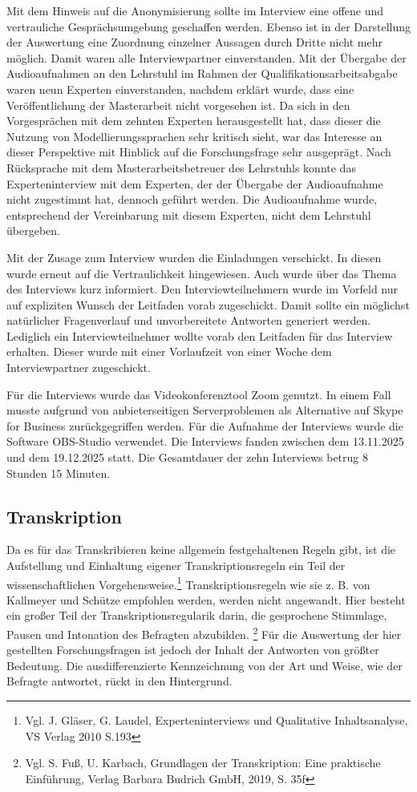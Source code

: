 Mit dem Hinweis auf die Anonymisierung sollte im Interview eine offene und vertrauliche Gesprächsumgebung geschaffen werden. Ebenso ist in der Darstellung der Auswertung eine Zuordnung einzelner Aussagen durch Dritte nicht mehr möglich. Damit waren alle Interviewpartner einverstanden. 
Mit der Übergabe der Audioaufnahmen an den Lehrstuhl im Rahmen der Qualifikationsarbeitsabgabe waren neun Experten einverstanden, nachdem erklärt wurde, dass eine Veröffentlichung der Masterarbeit nicht vorgesehen ist. 
Da sich in den Vorgesprächen mit dem zehnten Experten herausgestellt hat, dass dieser die Nutzung von Modellierungssprachen sehr kritisch sieht, war das Interesse an dieser Perspektive mit Hinblick auf die Forschungsfrage sehr ausgeprägt. Nach Rücksprache mit dem Masterarbeitsbetreuer des Lehrstuhls konnte das Experteninterview mit dem Experten, der der Übergabe der Audioaufnahme nicht zugestimmt hat, dennoch geführt werden. Die Audioaufnahme wurde, entsprechend der Vereinbarung mit diesem Experten, nicht dem Lehrstuhl übergeben. 

Mit der Zusage zum Interview wurden die Einladungen verschickt. In diesen wurde erneut auf die Vertraulichkeit hingewiesen. Auch wurde über das Thema des Interviews kurz informiert. Den Interviewteilnehmern wurde im Vorfeld nur auf expliziten Wunsch der Leitfaden vorab zugeschickt. Damit sollte ein möglichst natürlicher Fragenverlauf und unvorbereitete Antworten generiert werden. Lediglich ein Interviewteilnehmer wollte vorab den Leitfaden für das Interview erhalten. Dieser wurde mit einer Vorlaufzeit von einer Woche dem Interviewpartner zugeschickt. 

Für die Interviews wurde das Videokonferenztool Zoom genutzt. In einem Fall musste aufgrund von anbieterseitigen Serverproblemen als Alternative auf Skype for Business zurückgegriffen werden. Für die Aufnahme der Interviews wurde die Software OBS-Studio verwendet. 
Die Interviews fanden zwischen dem 13.11.2025 und dem 19.12.2025 statt. Die Gesamtdauer der zehn Interviews betrug 8 Stunden 15 Minuten. 

\subsection{Transkription}

Da es für das Transkribieren keine allgemein festgehaltenen Regeln gibt, ist die Aufstellung und Einhaltung eigener Transkriptionsregeln ein Teil der wissenschaftlichen Vorgehensweise.\footnote{Vgl. J. Gläser, G. Laudel, Experteninterviews und Qualitative Inhaltsanalyse, VS Verlag 2010 S.193}
Transkriptionsregeln wie sie z. B. von Kallmeyer und Schütze empfohlen werden, werden nicht angewandt. Hier besteht ein großer Teil der Transkriptionsregularik darin, die gesprochene Stimmlage, Pausen und Intonation des Befragten abzubilden. \footnote{Vgl. S. Fuß, U. Karbach, Grundlagen der Transkription: Eine praktische Einführung, Verlag Barbara Budrich GmbH, 2019, S. 35f} Für die Auswertung der hier gestellten Forschungsfragen ist jedoch der Inhalt der Antworten von größter Bedeutung. Die ausdifferenzierte Kennzeichnung von der Art und Weise, wie der Befragte antwortet, rückt in den Hintergrund.

